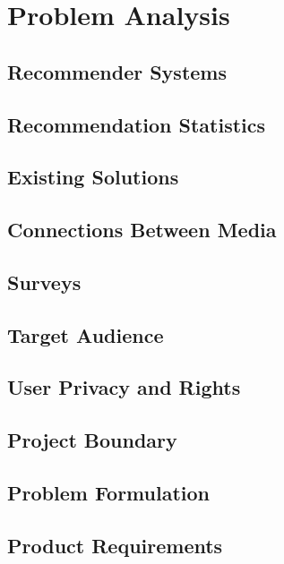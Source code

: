 \chapter{Problem Analysis}

\section{Recommender Systems}
\label{RecommenderSystems}

\section{Recommendation Statistics}
\label{Statistics}

\section{Existing Solutions}
\label{Existing}

\section{Connections Between Media}
\label{Connections}

\section{Surveys}
\label{Surveys}

\section{Target Audience}
\label{TargetAudience}

\section{User Privacy and Rights}
\label{User Rights}

\section{Project Boundary}
\label{Boundary}

\section{Problem Formulation}
\label{Formulation}

\section{Product Requirements}
\label{Requirements}
